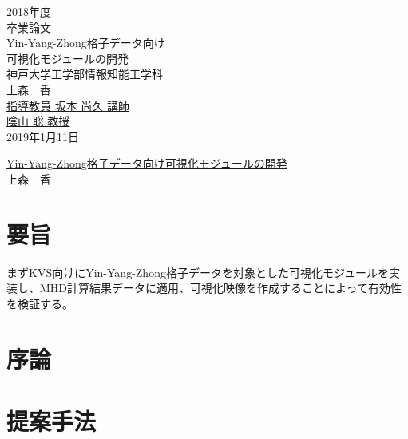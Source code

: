 \documentclass[12pt]{jarticle}
\begin{document}
\author{上森　香}
\date{today} 
\thispagestyle{empty}
\begin{center}
\huge{2018年度}\\
\huge{卒業論文}\\
\vspace{4cm}
\LARGE{Yin-Yang-Zhong格子データ向け\\可視化モジュールの開発}\\
\vspace{4cm}
\LARGE{神戸大学工学部情報知能工学科}\\
\vspace{0.45cm}
\LARGE{上森　香}\\
\vspace{1.2cm}
\LARGE{\underline{指導教員 坂本 尚久 講師}}\\
\hspace{31mm}\LARGE{\underline{陰山 \hspace{4mm} 聡 教授}}\\
\vspace{2cm}
\Large{2019年1月11日}
\end{center}

\newpage
\thispagestyle{empty}
\begin{center}
\Large{\underline{Yin-Yang-Zhong格子データ向け可視化モジュールの開発}}\\
\vspace{1.5cm}
\large{上森　香}
\end{center}
\vspace{1cm}
\section{要旨}
 まずKVS向けにYin-Yang-Zhong格子データを対象とした可視化モジュールを実装し、MHD計算結果データに適用、可視化映像を作成することによって有効性を検証する。
 
 \newpage
\thispagestyle{empty}
\tableofcontents

\newpage
\setcounter{page}{1}
\section{序論}

\newpage
\section{提案手法}
\end{document}
